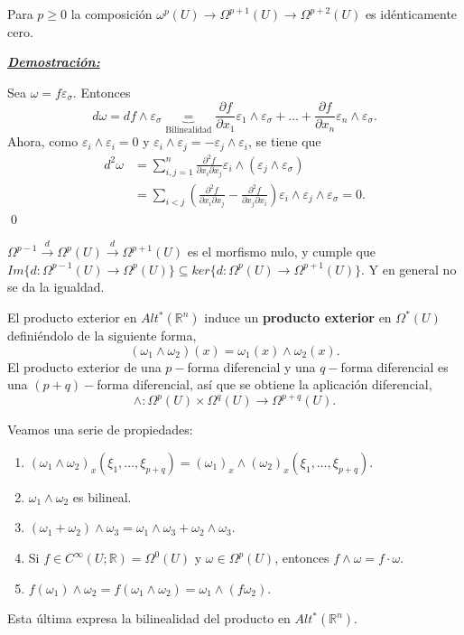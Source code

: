 \begin{Lem}
Para $p\ge 0$ la composición $\omega^p(U)\rightarrow \Omega^{p+1}(U)\rightarrow \Omega^{p+2}(U)$ es idénticamente cero. 
\end{Lem}


\underline{\textbf{\textit{Demostración:}}}

Sea $\omega=f\varepsilon_\sigma $. Entonces
$$d\omega=df\wedge \varepsilon_\sigma \underbrace{=}_{\text{Bilinealidad}} \frac{\partial f}{\partial x_1}\varepsilon_1\wedge \varepsilon_\sigma+\dots + \frac{\partial f}{\partial x_n} \varepsilon_n\wedge \varepsilon_\sigma. $$
Ahora, como $\varepsilon_i\wedge \varepsilon_i=0$ y $\varepsilon_i\wedge \varepsilon_j=- \varepsilon_j\wedge \varepsilon_i$, se tiene que
\begin{equation}
  \begin{split}
    d^2\omega &= \sum_{i,j=1}^n \frac{\partial^2f}{\partial x_i \partial x_j}\varepsilon_i \wedge (\varepsilon_j \wedge \varepsilon_\sigma) \\
    &= \sum_{i<j}(\frac{\partial^2f}{\partial x_i \partial x_j}-\frac{\partial^2f}{\partial x_j\partial x_i})\varepsilon_i\wedge \varepsilon_j\wedge \varepsilon_\sigma =0.
  \end{split}
\end{equation}
\qed

\begin{nota}
$\Omega^{p-1}\xrightarrow{d}\Omega^p(U)\xrightarrow{d} \Omega^{p+1}(U)$ es el morfismo nulo, y cumple que $Im\{d:\Omega^{p-1}(U)\rightarrow \Omega^p(U)\} \subseteq ker\{d:\Omega^p(U)\rightarrow \Omega^{p+1}(U)\}$.  Y en general no se da la igualdad. 
\end{nota}


El producto exterior en $Alt^*(\mathbb{R}^n)$ induce un \textbf{producto exterior} en $\Omega^*(U)$ definiéndolo de la siguiente forma,
$$(\omega_1\wedge \omega_2)(x)=\omega_1(x)\wedge \omega_2(x). $$
El producto exterior de una $p-$forma diferencial y una $q-$forma diferencial es una $(p+q)-$forma diferencial, así que se obtiene la aplicación diferencial,
$$\wedge:\Omega^p(U)\times \Omega^q(U)\rightarrow \Omega^{p+q}(U). $$



\vspace{3mm}
Veamos una serie de propiedades:

\begin{enumerate}
\item $(\omega_1\wedge \omega_2)_x(\xi_1,\dots,\xi_{p+q})=(\omega_1)_x\wedge (\omega_2)_x(\xi_1,\dots,\xi_{p+q})$.
\item $\omega_1\wedge \omega_2$ es bilineal.
\item $(\omega_1+\omega_2)\wedge \omega_3=\omega_1\wedge \omega_3+\omega_2\wedge \omega_3$.
\item Si $f\in C^\infty(U;\mathbb{R})=\Omega^0(U)$ y $\omega\in \Omega^p(U)$, entonces $f\wedge \omega=f\cdot \omega$.
\item $f(\omega_1)\wedge \omega_2=f(\omega_1\wedge \omega_2)=\omega_1\wedge (f\omega_2)$. 
\end{enumerate}
Esta última expresa la bilinealidad del producto en $Alt^*(\mathbb{R}^n)$. 

